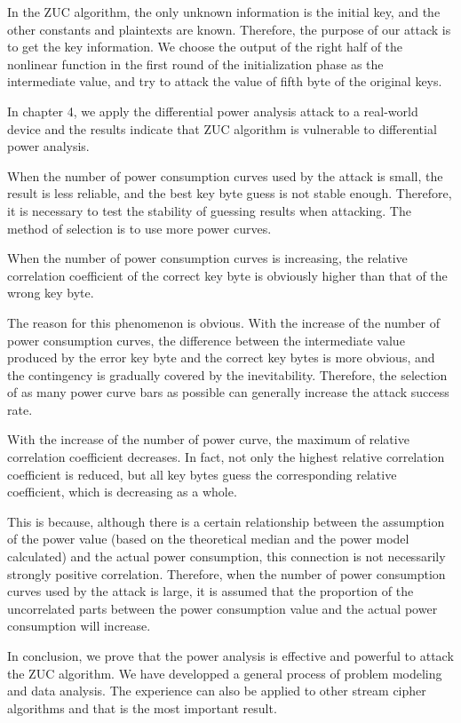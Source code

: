 \begin{bigabstract}
In the ZUC algorithm, the only unknown information is the initial key, and the other constants and plaintexts are known. Therefore, the purpose of our attack is to get the key information. We choose the output of the right half of the nonlinear function in the first round of the initialization phase as the intermediate value, and try to attack the value of fifth byte of the original keys.

In chapter 4, we apply the differential power analysis attack to a real-world device and the results indicate that ZUC algorithm is vulnerable to differential power analysis.

When the number of power consumption curves used by the attack is small, the result is less reliable, and the best key byte guess is not stable enough. Therefore, it is necessary to test the stability of guessing results when attacking. The method of selection is to use more power curves.

When the number of power consumption curves is increasing, the relative correlation coefficient of the correct key byte is obviously higher than that of the wrong key byte.

The reason for this phenomenon is obvious. With the increase of the number of power consumption curves, the difference between the intermediate value produced by the error key byte and the correct key bytes is more obvious, and the contingency is gradually covered by the inevitability. Therefore, the selection of as many power curve bars as possible can generally increase the attack success rate.

With the increase of the number of power curve, the maximum of relative correlation coefficient decreases. In fact, not only the highest relative correlation coefficient is reduced, but all key bytes guess the corresponding relative coefficient, which is decreasing as a whole. 

This is because, although there is a certain relationship between the assumption of the power value (based on the theoretical median and the power model calculated) and the actual power consumption, this connection is not necessarily strongly positive correlation. Therefore, when the number of power consumption curves used by the attack is large, it is assumed that the proportion of the uncorrelated parts between the power consumption value and the actual power consumption will increase.

In conclusion, we prove that the power analysis is effective and powerful to attack the ZUC algorithm. We have developped a general process of problem modeling and data analysis. The experience can also be applied to other stream cipher algorithms and that is the most important result.

\end{bigabstract}